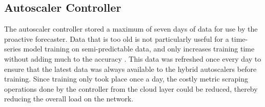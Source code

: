 \begin{center}
\begin{minipage}{\linewidth}
    \label{fig:lstm-final-data}
\end{minipage}
\end{center}

\subsection{Autoscaler Controller}
\label{subsec:ch5-auto-daemon-subsection}

The autoscaler controller stored a maximum of seven days of data for use by the proactive forecaster. Data that is too old is not particularly useful for a time-series model training on semi-predictable data, and only increases training time without adding much to the accuracy \cite{greff2016lstm}. This data was refreshed once every day to ensure that the latest data was always available to the hybrid autoscalers before training. Since training only took place once a day, the costly metric scraping operations done by the controller from the cloud layer could be reduced, thereby reducing the overall load on the network.\par

